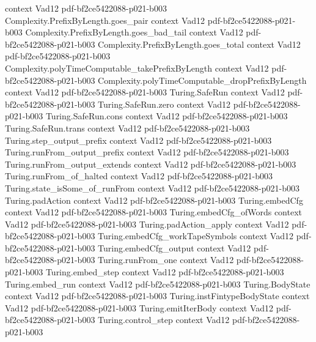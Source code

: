 \begin{theorem}
  {context}
  {Vad12}
  {pdf-bf2ce5422088-p021-b003}
\proofstep
  {Complexity.PrefixByLength.goes_pair}
  {context}
  {Vad12}
  {pdf-bf2ce5422088-p021-b003}
\proofstep
  {Complexity.PrefixByLength.goes_bad_tail}
  {context}
  {Vad12}
  {pdf-bf2ce5422088-p021-b003}
\proofstep
  {Complexity.PrefixByLength.goes_total}
  {context}
  {Vad12}
  {pdf-bf2ce5422088-p021-b003}
\proofstep
  {Complexity.polyTimeComputable_takePrefixByLength}
  {context}
  {Vad12}
  {pdf-bf2ce5422088-p021-b003}
\proofstep
  {Complexity.polyTimeComputable_dropPrefixByLength}
  {context}
  {Vad12}
  {pdf-bf2ce5422088-p021-b003}
\proofstep
  {Turing.SafeRun}
  {context}
  {Vad12}
  {pdf-bf2ce5422088-p021-b003}
\proofstep
  {Turing.SafeRun.zero}
  {context}
  {Vad12}
  {pdf-bf2ce5422088-p021-b003}
\proofstep
  {Turing.SafeRun.cons}
  {context}
  {Vad12}
  {pdf-bf2ce5422088-p021-b003}
\proofstep
  {Turing.SafeRun.trans}
  {context}
  {Vad12}
  {pdf-bf2ce5422088-p021-b003}
\proofstep
  {Turing.step_output_prefix}
  {context}
  {Vad12}
  {pdf-bf2ce5422088-p021-b003}
\proofstep
  {Turing.runFrom_output_prefix}
  {context}
  {Vad12}
  {pdf-bf2ce5422088-p021-b003}
\proofstep
  {Turing.runFrom_output_extends}
  {context}
  {Vad12}
  {pdf-bf2ce5422088-p021-b003}
\proofstep
  {Turing.runFrom_of_halted}
  {context}
  {Vad12}
  {pdf-bf2ce5422088-p021-b003}
\proofstep
  {Turing.state_isSome_of_runFrom}
  {context}
  {Vad12}
  {pdf-bf2ce5422088-p021-b003}
\proofstep
  {Turing.padAction}
  {context}
  {Vad12}
  {pdf-bf2ce5422088-p021-b003}
\proofstep
  {Turing.embedCfg}
  {context}
  {Vad12}
  {pdf-bf2ce5422088-p021-b003}
\proofstep
  {Turing.embedCfg_ofWords}
  {context}
  {Vad12}
  {pdf-bf2ce5422088-p021-b003}
\proofstep
  {Turing.padAction_apply}
  {context}
  {Vad12}
  {pdf-bf2ce5422088-p021-b003}
\proofstep
  {Turing.embedCfg_workTapeSymbols}
  {context}
  {Vad12}
  {pdf-bf2ce5422088-p021-b003}
\proofstep
  {Turing.embedCfg_output}
  {context}
  {Vad12}
  {pdf-bf2ce5422088-p021-b003}
\proofstep
  {Turing.runFrom_one}
  {context}
  {Vad12}
  {pdf-bf2ce5422088-p021-b003}
\proofstep
  {Turing.embed_step}
  {context}
  {Vad12}
  {pdf-bf2ce5422088-p021-b003}
\proofstep
  {Turing.embed_run}
  {context}
  {Vad12}
  {pdf-bf2ce5422088-p021-b003}
\proofstep
  {Turing.BodyState}
  {context}
  {Vad12}
  {pdf-bf2ce5422088-p021-b003}
\proofstep
  {Turing.instFintypeBodyState}
  {context}
  {Vad12}
  {pdf-bf2ce5422088-p021-b003}
\proofstep
  {Turing.emitIterBody}
  {context}
  {Vad12}
  {pdf-bf2ce5422088-p021-b003}
\proofstep
  {Turing.control_step}
  {context}
  {Vad12}
  {pdf-bf2ce5422088-p021-b003}
\proofstep

\end{theorem}
